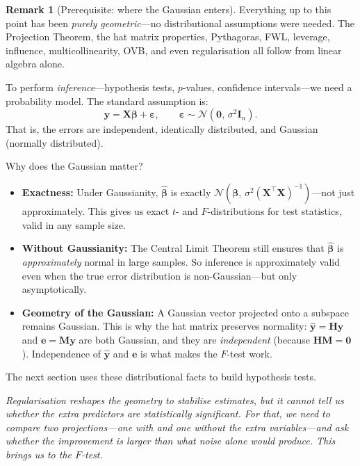 \documentclass[11pt,a4paper]{article}
\theoremstyle{plain}
\theoremstyle{definition}
\newtheorem{remark}[theorem]{Remark}
\newcommand{\yhat}{\hat{\bm{y}}}
\newcommand{\bhat}{\hat{\bm{\beta}}}
\newcommand{\bX}{\bm{X}}
\newcommand{\by}{\bm{y}}
\newcommand{\be}{\bm{e}}
\newcommand{\bH}{\bm{H}}
\newcommand{\bM}{\bm{M}}
\newcommand{\bI}{\bm{I}}
\begin{document}
\medskip
\begin{remark}[Prerequisite: where the Gaussian enters]
Everything up to this point has been \emph{purely geometric}---no
distributional assumptions were needed.
The Projection Theorem, the hat matrix properties, Pythagoras, FWL,
leverage, influence, multicollinearity, OVB, and even regularisation
all follow from linear algebra alone.

To perform \emph{inference}---hypothesis tests, $p$-values, confidence
intervals---we need a probability model.
The standard assumption is:
\[
  \by = \bX\bm{\beta} + \bm{\varepsilon},
  \qquad
  \bm{\varepsilon} \sim \mathcal{N}(\bm{0},\, \sigma^2 \bI_n).
\]
That is, the errors are independent, identically distributed, and
Gaussian (normally distributed).

Why does the Gaussian matter?
\begin{itemize}[nosep]
  \item \textbf{Exactness:} Under Gaussianity, $\bhat$ is exactly
        $\mathcal{N}(\bm{\beta},\, \sigma^2(\bX^\top\bX)^{-1})$---not
        just approximately. This gives us exact $t$- and $F$-distributions
        for test statistics, valid in any sample size.
  \item \textbf{Without Gaussianity:} The Central Limit Theorem still
        ensures that $\bhat$ is \emph{approximately} normal in large samples.
        So inference is approximately valid even when the true error
        distribution is non-Gaussian---but only asymptotically.
  \item \textbf{Geometry of the Gaussian:} A Gaussian vector projected
        onto a subspace remains Gaussian. This is why the hat matrix
        preserves normality: $\yhat = \bH\by$ and
        $\be = \bM\by$ are both Gaussian, and they are
        \emph{independent} (because $\bH\bM = \bm{0}$).
        Independence of $\yhat$ and $\be$ is what makes the $F$-test work.
\end{itemize}
The next section uses these distributional facts to build hypothesis tests.
\end{remark}

\medskip
\noindent\textit{Regularisation reshapes the geometry to stabilise
estimates, but it cannot tell us whether the extra predictors are
\emph{statistically significant}.
For that, we need to compare two projections---one with and one
without the extra variables---and ask whether the improvement is
larger than what noise alone would produce.
This brings us to the $F$-test.}
\end{document}
